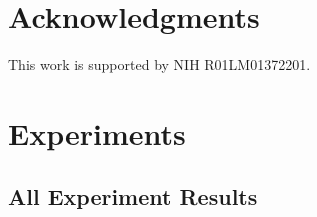 \documentclass{article}
\begin{document}
\section*{Acknowledgments}
This work is supported by NIH R01LM01372201.


  
  



\newpage
\appendix



\section{Experiments}
\label{sec:appendix_experiments}



\subsection{All Experiment Results}
\label{subsec:all_results}
\end{document}
